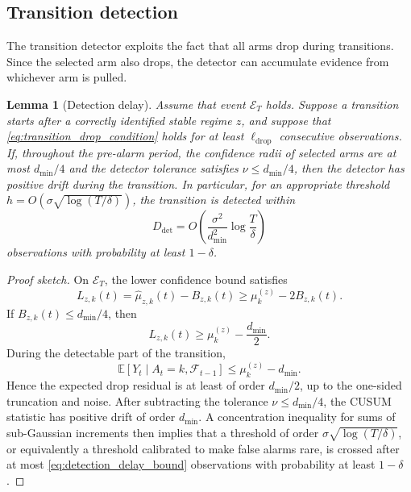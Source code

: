 \documentclass[11pt]{article}
\newtheorem{lemma}{Lemma}
\newcommand{\F}{\mathcal F}
\newcommand{\E}{\mathbb E}
\begin{document}
\subsection{Transition detection}
\label{subsec:transition_detection_proof}

The transition detector exploits the fact that all arms drop during transitions. Since the selected arm also drops, the detector can accumulate evidence from whichever arm is pulled.

\begin{lemma}[Detection delay]
\label{lem:detection_delay}
Assume that event $\mathcal E_T$ holds. Suppose a transition starts after a correctly identified stable regime $z$, and suppose that \eqref{eq:transition_drop_condition} holds for at least $\ell_{\mathrm{drop}}$ consecutive observations. If, throughout the pre-alarm period, the confidence radii of selected arms are at most $d_{\min}/4$ and the detector tolerance satisfies $\nu\leq d_{\min}/4$, then the detector has positive drift during the transition. In particular, for an appropriate threshold $h=O(\sigma\sqrt{\log(T/\delta)})$, the transition is detected within
\begin{equation}
\label{eq:detection_delay_bound}
D_{\mathrm{det}}
=
O\left(
\frac{\sigma^2}{d_{\min}^2}\log\frac{T}{\delta}
\right)
\end{equation}
observations with probability at least $1-\delta$.
\end{lemma}

\begin{proof}[Proof sketch]
On $\mathcal E_T$, the lower confidence bound satisfies
\begin{equation}
\label{eq:lcb_lower_during_transition}
L_{z,k}(t)
=
\widehat\mu_{z,k}(t)-B_{z,k}(t)
\geq
\mu_k^{(z)}-2B_{z,k}(t).
\end{equation}
If $B_{z,k}(t)\leq d_{\min}/4$, then
\begin{equation}
\label{eq:lcb_transition_gap}
L_{z,k}(t)
\geq
\mu_k^{(z)}-\frac{d_{\min}}{2}.
\end{equation}
During the detectable part of the transition,
\begin{equation}
\label{eq:transition_expected_reward}
\E[Y_t\mid A_t=k,\F_{t-1}]
\leq
\mu_k^{(z)}-d_{\min}.
\end{equation}
Hence the expected drop residual is at least of order $d_{\min}/2$, up to the one-sided truncation and noise. After subtracting the tolerance $\nu\leq d_{\min}/4$, the CUSUM statistic has positive drift of order $d_{\min}$. A concentration inequality for sums of sub-Gaussian increments then implies that a threshold of order $\sigma\sqrt{\log(T/\delta)}$, or equivalently a threshold calibrated to make false alarms rare, is crossed after at most \eqref{eq:detection_delay_bound} observations with probability at least $1-\delta$.
\end{proof}
\end{document}
